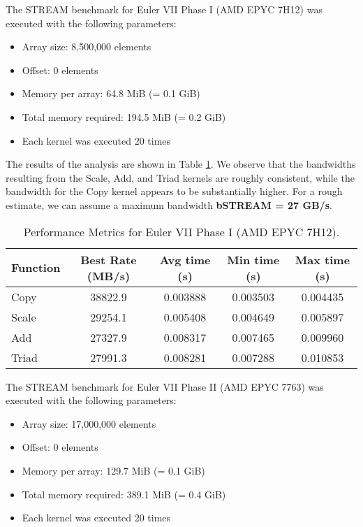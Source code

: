 \documentclass[unicode,11pt,a4paper,oneside,numbers=endperiod,openany]{scrartcl}
\begin{document}
The STREAM benchmark for Euler VII Phase I (AMD EPYC 7H12) was executed with the following parameters:
\begin{itemize}
    \item Array size: 8,500,000 elements
    \item Offset: 0 elements
    \item Memory per array: 64.8 MiB (= 0.1 GiB)
    \item Total memory required: 194.5 MiB (= 0.2 GiB)
    \item Each kernel was executed 20 times
\end{itemize}

The results of the analysis are shown in Table \ref{tab:performance_I}. 
We observe that the bandwidths resulting from the Scale, Add, and Triad kernels are roughly
consistent, while the bandwidth for the Copy kernel appears to be substantially higher. 
For a rough estimate, we can assume a maximum bandwidth \textbf{bSTREAM = 27 GB/s}.
\begin{table}[htbp]
    \centering
    \caption{Performance Metrics for Euler VII Phase I (AMD EPYC 7H12).}
    \begin{tabular}{||lcccc||}
        \hline
        Function & Best Rate (MB/s) & Avg time (s) & Min time (s) & Max time (s)\\
        \hline
        \hline
        Copy    & 38822.9 & 0.003888 & 0.003503 & 0.004435 \\
        \hline
        Scale   & 29254.1 & 0.005408 & 0.004649 & 0.005897 \\
        \hline
        Add     & 27327.9 & 0.008317 & 0.007465 & 0.009960 \\
        \hline
        Triad   & 27991.3 & 0.008281 & 0.007288 & 0.010853 \\
        \hline
    \end{tabular}
    \label{tab:performance_I}
\end{table}

The STREAM benchmark for Euler VII Phase II (AMD EPYC 7763) was executed with the following parameters:
\begin{itemize}
    \item Array size: 17,000,000 elements
    \item Offset: 0 elements
    \item Memory per array: 129.7 MiB (= 0.1 GiB)
    \item Total memory required: 389.1 MiB (= 0.4 GiB)
    \item Each kernel was executed 20 times
\end{itemize}
\end{document}
